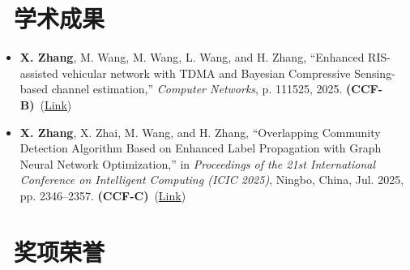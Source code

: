 \documentclass{resume}
\begin{document}
\section{\faBook\ 学术成果}
\begin{onehalfspacing}
\begin{itemize}

\item \textbf{X. Zhang}, M. Wang, M. Wang, L. Wang, and H. Zhang, ``Enhanced RIS-assisted vehicular network with TDMA and Bayesian Compressive Sensing-based channel estimation,'' \emph{Computer Networks}, p. 111525, 2025. \textbf{(CCF-B)}~({\href{https://www.sciencedirect.com/science/article/abs/pii/S138912862500492X}{Link}})
\item \textbf{X. Zhang}, X. Zhai, M. Wang, and H. Zhang, ``Overlapping Community Detection Algorithm Based on Enhanced Label Propagation with Graph Neural Network Optimization,'' in \emph{Proceedings of the 21st International Conference on Intelligent Computing (ICIC 2025)}, Ningbo, China, Jul. 2025, pp. 2346--2357. \textbf{(CCF-C)}~({\href{https://scholar.google.com.sg/scholar?q=%E2%80%9COverlapping+Community+Detection+Algorithm+Based+on+Enhanced+Label+Propagation+with+Graph+Neural+Network+Optimization,&hl=zh-CN&as_sdt=0&as_vis=1&oi=scholart}{Link}})
\end{itemize}


\end{onehalfspacing}



\section{\faTrophy\ 奖项荣誉}
\begin{onehalfspacing}

\end{onehalfspacing}

\pagebreak
\end{document}
